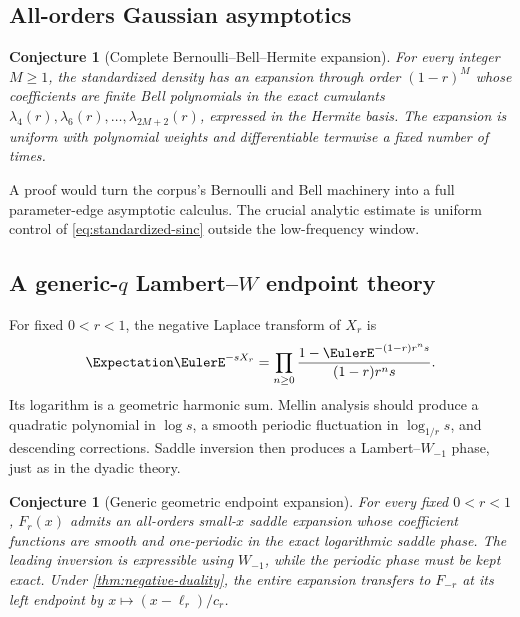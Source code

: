 \documentclass[11pt]{article}
\newtheorem{conjecture}[theorem]{Conjecture}
\theoremstyle{definition}
\begin{document}
\subsection{All-orders Gaussian asymptotics}

\begin{conjecture}[Complete Bernoulli--Bell--Hermite expansion]\label{conj:all-orders}
For every integer \(M\ge1\), the standardized density has an expansion through order
\((1-r)^M\) whose coefficients are finite Bell polynomials in the exact cumulants
\(\lambda_4(r),\lambda_6(r),\ldots,\lambda_{2M+2}(r)\), expressed in the Hermite basis.
The expansion is uniform with polynomial weights and differentiable termwise a fixed
number of times.
\end{conjecture}

A proof would turn the corpus's Bernoulli and Bell machinery into a full parameter-edge
asymptotic calculus.  The crucial analytic estimate is uniform control of
\cref{eq:standardized-sinc} outside the low-frequency window.

\subsection{A generic-$q$ Lambert--\texorpdfstring{$W$}{W} endpoint theory}

For fixed \(0<r<1\), the negative Laplace transform of \(X_r\) is
\begin{equation}
 \Expectation \EulerE^{-sX_r}
 =\prod_{n\ge0}
 \frac{1-\EulerE^{-(1-r)r^ns}}{(1-r)r^ns}.                      \label{eq:general-laplace-product}
\end{equation}
Its logarithm is a geometric harmonic sum.  Mellin analysis should produce a quadratic
polynomial in \(\log s\), a smooth periodic fluctuation in
\(\log_{1/r}s\), and descending corrections.  Saddle inversion then produces a
Lambert--\(W_{-1}\) phase, just as in the dyadic theory.

\begin{conjecture}[Generic geometric endpoint expansion]\label{conj:generic-endpoint}
For every fixed \(0<r<1\), \(F_r(x)\) admits an all-orders small-\(x\) saddle expansion
whose coefficient functions are smooth and one-periodic in the exact logarithmic saddle
phase.  The leading inversion is expressible using \(W_{-1}\), while the periodic phase
must be kept exact.  Under \cref{thm:negative-duality}, the entire expansion transfers to
\(F_{-r}\) at its left endpoint by \(x\mapsto(x-\ell_r)/c_r\).
\end{conjecture}
\end{document}
